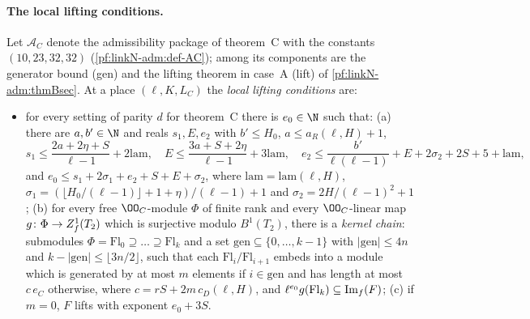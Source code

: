 \paragraph{The local lifting conditions.}
Let $\mathcal A_C$ denote the admissibility package of theorem~C with the constants $(10,23,32,32)$
(\cref{pf:linkN-adm:def-AC}); among its components are the generator bound (gen) and the lifting theorem in case~A (lift) of \cref{pf:linkN-adm:thmBsec}. At a place $(\ell,K,L_C)$
the \emph{local lifting conditions} are:

\begin{itemize}
\item[(LLC)] for every setting of parity $d$ for theorem~C there is $e_0\in\N$ such that: (a) there are $a,b'\in\N$ and
  reals $s_1,E,e_2$ with $b'\le H_0$, $a\le a_R(\ell,H)+1$,
  \[
  s_1\le\frac{2a+2\eta+S}{\ell-1}+2\mathrm{lam},\quad E\le\frac{3a+S+2\eta}{\ell-1}+3\mathrm{lam},\quad
  e_2\le\frac{b'}{\ell(\ell-1)}+E+2\sigma_2+2S+5+\mathrm{lam},
  \]
  and $e_0\le s_1+2\sigma_1+e_2+S+E+\sigma_2$, where $\mathrm{lam}=\mathrm{lam}(\ell,H)$,
  $\sigma_1=(\lfloor H_0/(\ell-1)\rfloor+1+\eta)/(\ell-1)+1$ and $\sigma_2=2H/(\ell-1)^2+1$; (b) for every free $\OO_C$-module
  $\Phi$ of finite rank and every $\OO_C$-linear map $g\colon\Phi\to Z^1_{f}(T_2)$ which is surjective modulo
  $B^1(T_2)$, there is a \emph{kernel chain}: submodules $\Phi=\mathrm{Fl}_0\supseteq\dots\supseteq\mathrm{Fl}_k$ and a set
  $\mathrm{gen}\subseteq\{0,\dots,k-1\}$ with $|\mathrm{gen}|\le4n$ and $k-|\mathrm{gen}|\le\lfloor3n/2\rfloor$, such that
  each $\mathrm{Fl}_i/\mathrm{Fl}_{i+1}$ embeds into a module which is generated by at most $m$ elements if
  $i\in\mathrm{gen}$ and has length at most $c\,e_C$ otherwise, where $c=rS+2m\,c_D(\ell,H)$, and
  $\ell^{e_0}g(\mathrm{Fl}_k)\subseteq\operatorname{Im}_f(F)$; (c) if $m=0$, $F$ lifts with exponent $e_0+3S$.
\end{itemize}

